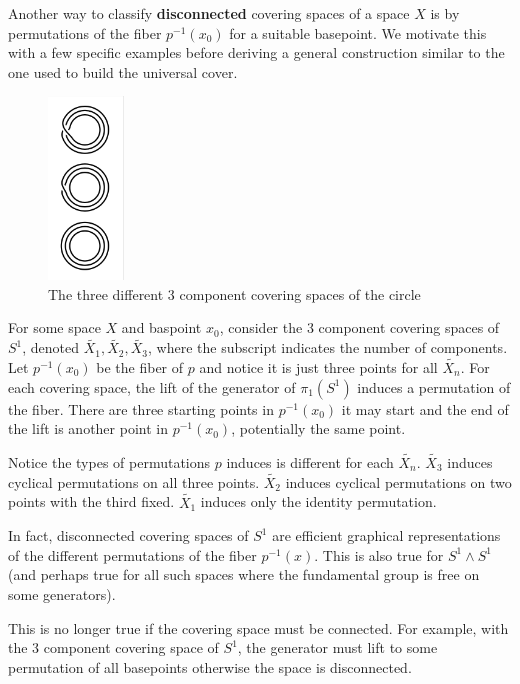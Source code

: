 \documentclass[10pt]{article}
\begin{document}
Another way to classify \textbf{disconnected} covering spaces of a space $X$
is by permutations of the fiber $p^{-1}(x_0)$ for a suitable basepoint. We
motivate this with a few specific examples before deriving a general construction
similar to the one used to build the universal cover.

\begin{figure}[ht!]
\centering
\includegraphics[width=20mm]{3-component-covering-spaces-of-s1.png}
\caption{The three different 3 component covering spaces of the circle}
\end{figure}

\begin{note}
	For some space $X$ and baspoint $x_0$, consider the 3 component covering
	spaces of $S^1$, denoted $\tilde{X_1}, \tilde{X_2}, \tilde{X_3}$, where the
	subscript indicates the number of components. Let $p^{-1}(x_0)$ be the fiber
	of $p$ and notice it is just three points for all $\tilde{X_n}$. For each
	covering space, the lift of the generator of $\pi_1(S^1)$ induces a
	permutation of the fiber. There are three starting points in $p^{-1}(x_0)$ it
	may start and the end of the lift is another point in $p^{-1}(x_0)$,
	potentially the same point.

	Notice the types of permutations $p$ induces is different for each
	$\tilde{X_n}$. $\tilde{X_3}$ induces cyclical permutations on all three points.
	$\tilde{X_2}$ induces cyclical permutations on two points with the third
	fixed. $\tilde{X_1}$ induces only the identity permutation.
\end{note}

In fact, disconnected covering spaces of $S^1$ are efficient graphical
representations of the different permutations of the fiber $p^{-1}(x)$.
This is also true for $S^1 \wedge S^1$ (and perhaps true for all such spaces
where the fundamental group is free on some generators). 

This is no longer true if the covering space must be connected. For example,
with the 3 component covering space of $S^1$, the generator must lift to some
permutation of all basepoints otherwise the space is disconnected.
\end{document}
